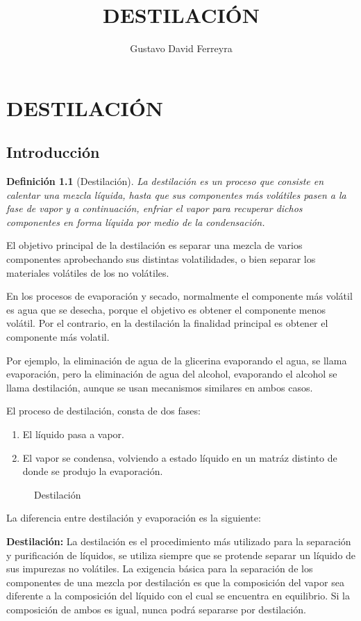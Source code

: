\documentclass[11pt,openany]{book}
\title{DESTILACIÓN}
\author{Gustavo David Ferreyra}
\newtheorem{defi}{Definición}
\begin{document}

\newpage\null\thispagestyle{empty}
\newpage\tableofcontents{\thispagestyle{empty}}
\newpage\setcounter{page}{1}
\chapter{DESTILACIÓN}
\section{Introducción}
\begin{defi}[Destilación]
La destilación es un proceso que consiste en calentar una mezcla líquida, hasta que sus componentes más 
volátiles pasen a la fase de vapor y a continuación, enfriar el vapor para recuperar dichos 
componentes en forma líquida por medio de la condensación.
\end{defi}

El objetivo principal de la destilación es separar una mezcla de varios componentes aprobechando 
sus distintas volatilidades, o bien separar los materiales volátiles de los no volátiles.

En los procesos de evaporación y secado, normalmente el componente más volátil es agua que se desecha, porque el objetivo es obtener 
el componente menos volátil. Por el contrario, en la destilación la finalidad principal es obtener el componente más volatil.

Por ejemplo, la eliminación de agua de la glicerina evaporando el agua, se llama evaporación, pero 
la eliminación de agua del alcohol, evaporando el alcohol se llama destilación, aunque se usan 
mecanismos similares en ambos casos.

El proceso de destilación, consta de dos fases:
\begin{enumerate}
\item El líquido pasa a vapor. 
\item El vapor se condensa, volviendo a estado líquido en un matráz distinto de donde se produjo la evaporación.
\end{enumerate}
\begin{figure}
  \centering
  
  \caption{Destilación}  
\end{figure}
 
La diferencia entre destilación y evaporación es la siguiente:


\textbf{Destilación:} La destilación es el procedimiento más utilizado para la separación y purificación de 
líquidos, se utiliza siempre  que se protende separar un líquido de sus impurezas no volátiles.
La exigencia básica para la separación de los componentes de una mezcla por destilación es que la 
composición del vapor sea diferente a la composición del líquido con el cual se encuentra en equilibrio. Si 
la composición de ambos es igual, nunca podrá separarse por destilación.
\end{document}
